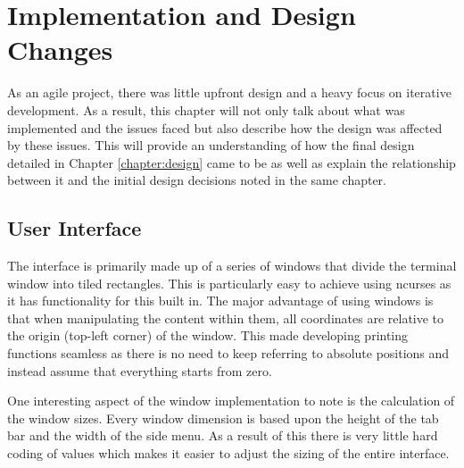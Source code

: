 \chapter{Implementation and Design Changes}
\label{chapter:implementation}




As an agile project, there was little upfront design and a heavy focus on iterative development. As a result, this chapter will not only talk about what was implemented and the issues faced but also describe how the design was affected by these issues. This will provide an understanding of how the final design detailed in Chapter \ref{chapter:design} came to be as well as explain the relationship between it and the initial design decisions noted in the same chapter.

\section{User Interface}

The interface is primarily made up of a series of windows that divide the terminal window into tiled rectangles. This is particularly easy to achieve using {\selectfont ncurses} as it has functionality for this built in. The major advantage of using windows is that when manipulating the content within them, all coordinates are relative to the origin (top-left corner) of the window. This made developing printing functions seamless as there is no need to keep referring to absolute positions and instead assume that everything starts from zero.

One interesting aspect of the window implementation to note is the calculation of the window sizes. Every window dimension is based upon the height of the tab bar and the width of the side menu. As a result of this there is very little hard coding of values which makes it easier to adjust the sizing of the entire interface.

